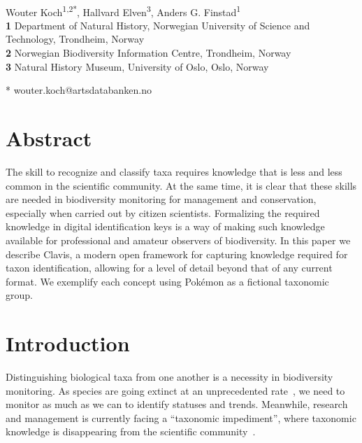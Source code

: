 \documentclass[10pt,letterpaper]{article}
\begin{document}
\vspace*{0.2in}

\begin{flushleft}
{\Large
\textbf{}
}
\newline
\\
Wouter Koch\textsuperscript{1,2*},
Hallvard Elven\textsuperscript{3},
Anders G. Finstad\textsuperscript{1}
\\
\bigskip
\textbf{1} Department of Natural History, Norwegian University of Science and Technology, Trondheim, Norway
\\
\textbf{2} Norwegian Biodiversity Information Centre, Trondheim, Norway
\\
\textbf{3} Natural History Museum, University of Oslo, Oslo, Norway
\\
\bigskip

* wouter.koch@artsdatabanken.no

\end{flushleft}
\section*{
Abstract
}
The skill to recognize and classify taxa requires knowledge that is less and less common in the scientific community. At the same time, it is clear that these skills are needed in biodiversity monitoring for management and conservation, especially when carried out by citizen scientists. Formalizing the required knowledge in digital identification keys is a way of making such knowledge available for professional and amateur observers of biodiversity. In this paper we describe Clavis, a modern open framework for capturing knowledge required for taxon identification, allowing for a level of detail beyond that of any current format. We exemplify each concept using Pokémon as a fictional taxonomic group.
\linenumbers
\section*{
Introduction
}
Distinguishing biological taxa from one another is a necessity in biodiversity monitoring. As species are going extinct at an unprecedented rate~\cite{Ceballos2015, Johnson2017}, we need to monitor as much as we can to identify statuses and trends. Meanwhile, research and management is currently facing a ``taxonomic impediment'', where taxonomic knowledge is disappearing from the scientific community~\cite{Engel2021}.
\end{document}
